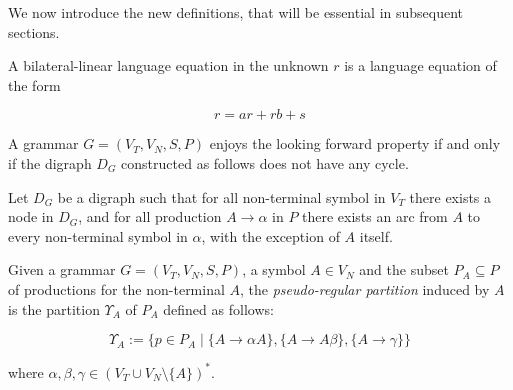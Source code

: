 We now introduce the new definitions, that will be essential in subsequent sections.

\begin{definition}
	\label{dfn:bl-language-equation}
	A bilateral-linear language equation in the unknown $r$ is a language equation of the form
	
	\begin{equation}
	\label{eqn:ll-rl-language}
	r=ar+rb+s
	\end{equation}
\end{definition}

\begin{definition}
	\label{dfn:looking-forward-property}
	A grammar $G=(V_{T},V_{N},S,P)$ enjoys the looking forward property if and only if the digraph $D_{G}$ constructed as follows does not have any cycle.
	
	Let $D_{G}$ be a digraph such that for all non-terminal symbol in $V_{T}$ there exists a node in $D_{G}$, and for all production $A\rightarrow\alpha$ in $P$ there exists an arc from $A$ to every non-terminal symbol in $\alpha$, with the exception of $A$ itself.
\end{definition}

\begin{definition}
	\label{dfn:pseudo-regular-partition}
	Given a grammar $G=(V_{T},V_{N},S,P)$, a symbol $A\in V_{N}$ and the subset $P_{A}\subseteq P$ of productions for the non-terminal $A$, the \textit{pseudo-regular partition} induced by $A$ is the partition $\Upsilon_{A}$ of $P_{A}$ defined as follows:
	
	\begin{equation}
	\label{eqn:pseudo-regular-partition}
	\Upsilon_{A}:= 
	\biggl\{p\in P_{A} \;\bigg|\;
	\{A\rightarrow\alpha A\}, 
	\{A\rightarrow A\beta\}, 
	\{A\rightarrow\gamma\}
	\biggl\}
	\end{equation}
	
	where $\alpha,\beta,\gamma\in\left(V_{T}\cup V_{N}\setminus\{A\}\right)^{*}$.
\end{definition}